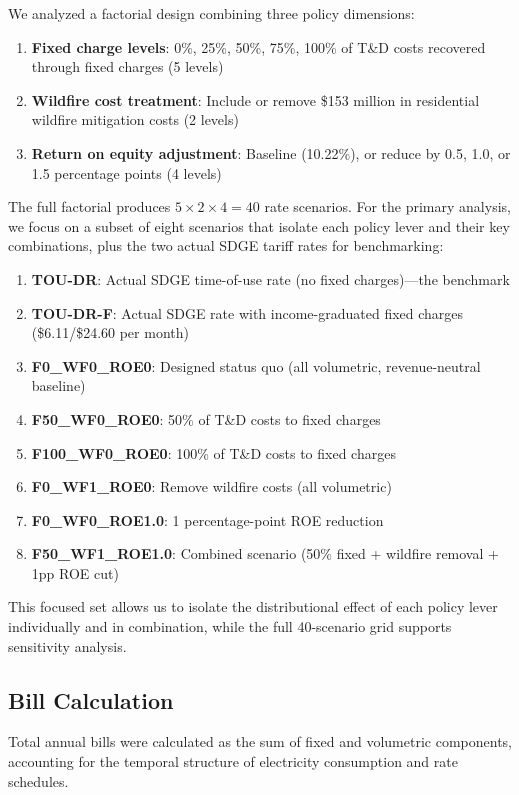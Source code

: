 \documentclass[12pt]{article}
\begin{document}
We analyzed a factorial design combining three policy dimensions:
\begin{enumerate}
    \item \textbf{Fixed charge levels}: 0\%, 25\%, 50\%, 75\%, 100\% of T\&D costs recovered through fixed charges (5 levels)
    \item \textbf{Wildfire cost treatment}: Include or remove \$153 million in residential wildfire mitigation costs (2 levels)
    \item \textbf{Return on equity adjustment}: Baseline (10.22\%), or reduce by 0.5, 1.0, or 1.5 percentage points (4 levels)
\end{enumerate}
The full factorial produces $5 \times 2 \times 4 = 40$ rate scenarios. For the primary analysis, we focus on a subset of eight scenarios that isolate each policy lever and their key combinations, plus the two actual SDGE tariff rates for benchmarking:
\begin{enumerate}
    \item \textbf{TOU-DR}: Actual SDGE time-of-use rate (no fixed charges)---the benchmark
    \item \textbf{TOU-DR-F}: Actual SDGE rate with income-graduated fixed charges (\$6.11/\$24.60 per month)
    \item \textbf{F0\_WF0\_ROE0}: Designed status quo (all volumetric, revenue-neutral baseline)
    \item \textbf{F50\_WF0\_ROE0}: 50\% of T\&D costs to fixed charges
    \item \textbf{F100\_WF0\_ROE0}: 100\% of T\&D costs to fixed charges
    \item \textbf{F0\_WF1\_ROE0}: Remove wildfire costs (all volumetric)
    \item \textbf{F0\_WF0\_ROE1.0}: 1 percentage-point ROE reduction
    \item \textbf{F50\_WF1\_ROE1.0}: Combined scenario (50\% fixed + wildfire removal + 1pp ROE cut)
\end{enumerate}
This focused set allows us to isolate the distributional effect of each policy lever individually and in combination, while the full 40-scenario grid supports sensitivity analysis.

\subsection{Bill Calculation}

Total annual bills were calculated as the sum of fixed and volumetric components, accounting for the temporal structure of electricity consumption and rate schedules.
\end{document}
